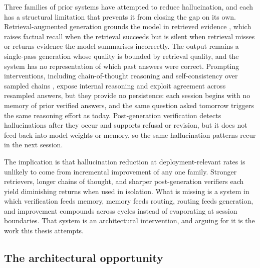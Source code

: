 Three families of prior systems have attempted to reduce hallucination, and each has a structural limitation that prevents it from closing the gap on its own. Retrieval-augmented generation grounds the model in retrieved evidence \cite{NEURIPS2020_6b493230}, which raises factual recall when the retrieval succeeds but is silent when retrieval misses or returns evidence the model summarises incorrectly. The output remains a single-pass generation whose quality is bounded by retrieval quality, and the system has no representation of which past answers were correct. Prompting interventions, including chain-of-thought reasoning and self-consistency over sampled chains \cite{wei2022chain, wang2023selfconsistency}, expose internal reasoning and exploit agreement across resampled answers, but they provide no persistence: each session begins with no memory of prior verified answers, and the same question asked tomorrow triggers the same reasoning effort as today. Post-generation verification \cite{manakul-etal-2023-selfcheckgpt, farquhar2024semantic} detects hallucinations after they occur and supports refusal or revision, but it does not feed back into model weights or memory, so the same hallucination patterns recur in the next session.

The implication is that hallucination reduction at deployment-relevant rates is unlikely to come from incremental improvement of any one family. Stronger retrievers, longer chains of thought, and sharper post-generation verifiers each yield diminishing returns when used in isolation. What is missing is a system in which verification feeds memory, memory feeds routing, routing feeds generation, and improvement compounds across cycles instead of evaporating at session boundaries. That system is an architectural intervention, and arguing for it is the work this thesis attempts.

\subsection{The architectural opportunity}
\label{sec:arch-opportunity}

